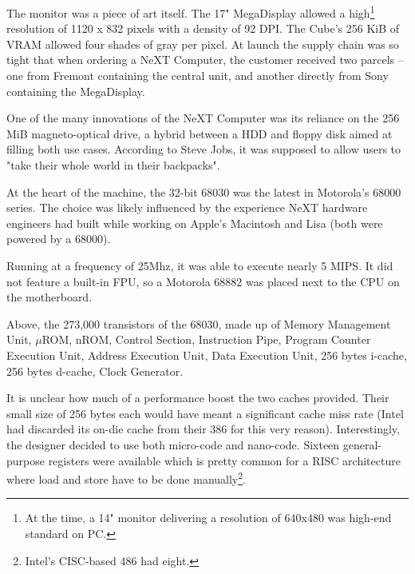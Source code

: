 The monitor was a piece of art itself. The 17" MegaDisplay allowed a high\footnote{At the time, a 14" monitor delivering a resolution of 640x480 was high-end standard on PC.} resolution of 1120 x 832 pixels with a density of 92 DPI. The Cube's 256 KiB of VRAM allowed four shades of gray per pixel. At launch the supply chain was so tight that when ordering a NeXT Computer, the customer received two parcels -- one from Fremont containing the central unit, and another directly from Sony containing the MegaDisplay.





\begin{figure}[H]
\centering
{}
\end{figure}
\par
One of the many innovations of the NeXT Computer was its reliance on the 256 MiB magneto-optical drive, a hybrid between a HDD and floppy disk aimed at filling both use cases. According to Steve Jobs, it was supposed to allow users to "take their whole world in their backpacks".\\
\par
At the heart of the machine, the 32-bit 68030 was the latest in Motorola's 68000 series. The choice was likely influenced by the experience NeXT hardware engineers had built while working on Apple's Macintosh and Lisa (both were powered by a 68000).\\
\par
 Running at a frequency of 25Mhz, it was able to execute nearly 5 MIPS. It did not feature a built-in FPU, so a Motorola 68882 was placed next to the CPU on the motherboard. %



\begin{figure}[H]
\centering
{}
\end{figure}
\par
\vspace{-3mm}
Above, the 273,000 transistors of the 68030, made up of  Memory Management Unit,  $\mu$ROM,  nROM,  Control Section,  Instruction Pipe,  Program Counter Execution Unit,  Address Execution Unit,  Data Execution Unit,  256 bytes i-cache,  256 bytes d-cache,  Clock Generator.\\         
\par
It is unclear how much of a performance boost the two caches provided. Their small size of 256 bytes each would have meant a significant cache miss rate (Intel had discarded its on-die cache from their 386 for this very reason). Interestingly, the designer decided to use both micro-code and nano-code. Sixteen general-purpose registers were available which is pretty common for a RISC architecture where load and store have to be done manually\footnote{Intel's CISC-based 486 had eight.}.

